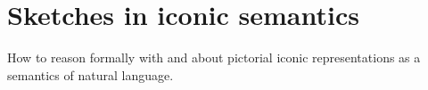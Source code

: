 \clearpage
\newpage
\chapter{Sketches in iconic semantics}\label{chapter:contrel}
How to reason formally with and about pictorial iconic representations as a semantics of natural language.
\clearpage
\newpage

\clearpage
\newpage

\clearpage
\newpage

\clearpage
\newpage

\clearpage
\newpage

\clearpage
\newpage





